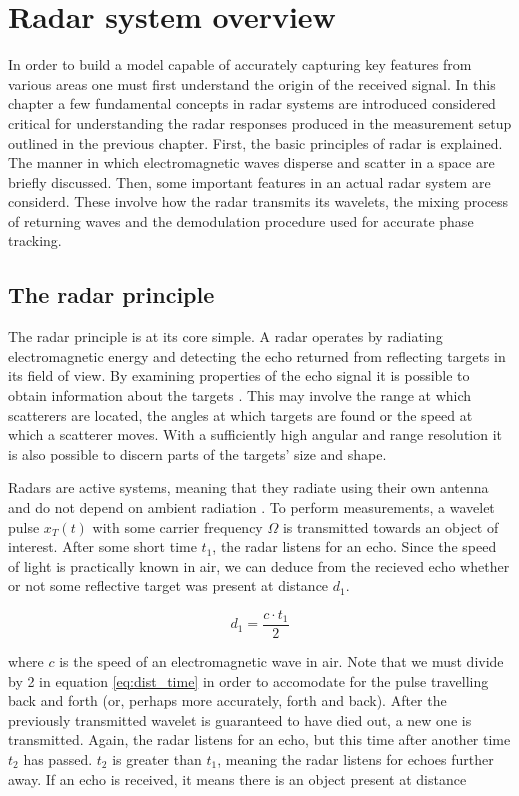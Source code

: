 \chapter{Radar system overview}


In order to build a model capable of accurately capturing key features from various areas one must first understand the origin of the received signal. In this chapter a few fundamental concepts in radar systems are introduced considered critical for understanding the radar responses produced in the measurement setup outlined in the previous chapter. First, the basic principles of radar is explained. The manner in which electromagnetic waves disperse and scatter in a space are briefly discussed. Then, some important features in an actual radar system are considerd. These involve how the radar transmits its wavelets, the mixing process of returning waves and the demodulation procedure used for accurate phase tracking. 

\section{The radar principle}

The radar principle is at its core simple. A radar operates by radiating electromagnetic energy and detecting the echo returned from reflecting targets in its field of view\citep{skolnik_2009}. By examining properties of the echo signal it is possible to obtain information about the targets \citep{richards_2014}. This may involve the range at which scatterers are located, the angles at which targets are found or the speed at which a scatterer moves. With a sufficiently high angular and range resolution it is also possible to discern parts of the targets' size and shape. 

Radars are active systems, meaning that they radiate using their own antenna and do not depend on ambient radiation \citep{skolnik_2009}. To perform measurements, a wavelet pulse $x_T(t)$ with some carrier frequency $\Omega$  is transmitted towards an object of interest. After some short time $t_1$, the radar listens for an echo. Since the speed of light is practically known in air, we can deduce from the recieved echo whether or not some reflective target was present at distance $d_1$.

\begin{equation}\label{eq:dist_time}
	d_1 = \frac{c\cdot t_1}2
\end{equation}

where $c$ is the speed of an electromagnetic wave in air. Note that we must divide by 2 in equation \ref{eq:dist_time} in order to accomodate for the pulse travelling back and forth (or, perhaps more accurately, forth and back). After the previously transmitted wavelet is guaranteed to have died out, a new one is transmitted. Again, the radar listens for an echo, but this time after another time $t_2$ has passed. $t_2$ is greater than $t_1$, meaning the radar listens for echoes further away. If an echo is received, it means there is an object present at distance 

